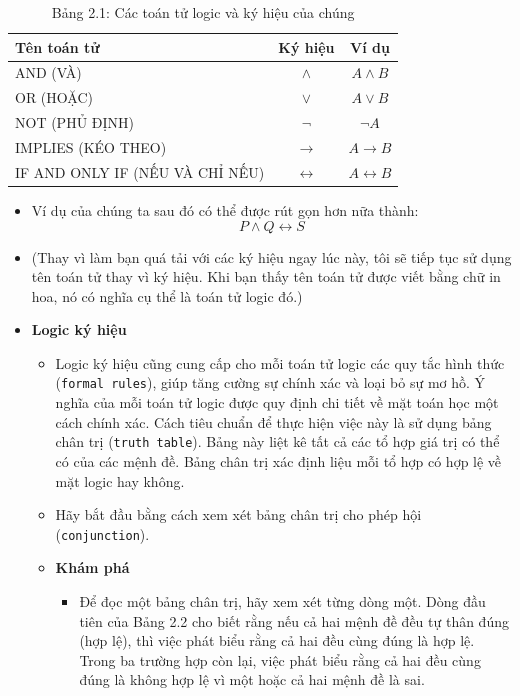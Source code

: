 \begin{table}[H]
\centering
\renewcommand{\arraystretch}{1.4}
\begin{tabular}{|l|c|c|}
\hline
\textbf{Tên toán tử} & \textbf{Ký hiệu} & \textbf{Ví dụ} \\ \hline

AND (VÀ) & $\land$ & $A \land B$ \\ \hline

OR (HOẶC) & $\lor$ & $A \lor B$ \\ \hline

NOT (PHỦ ĐỊNH) & $\neg$ & $\neg A$ \\ \hline

IMPLIES (KÉO THEO) & $\rightarrow$ & $A \rightarrow B$ \\ \hline

IF AND ONLY IF (NẾU VÀ CHỈ NẾU) & $\leftrightarrow$ & $A \leftrightarrow B$ \\ \hline

\end{tabular}
\caption*{Bảng 2.1: Các toán tử logic và ký hiệu của chúng}
\end{table}

\begin{itemize}
    \item Ví dụ của chúng ta sau đó có thể được rút gọn hơn nữa thành:
    \[
        P \land Q \leftrightarrow S
    \]

    \item (Thay vì làm bạn quá tải với các ký hiệu ngay lúc này, tôi sẽ tiếp tục sử dụng tên toán tử thay vì ký hiệu. Khi bạn thấy tên toán tử được viết bằng chữ in hoa, nó có nghĩa cụ thể là toán tử logic đó.)

    \item \textbf{Logic ký hiệu}
    \begin{itemize}
        \item Logic ký hiệu cũng cung cấp cho mỗi toán tử logic các quy tắc hình thức (\texttt{formal rules}), giúp tăng cường sự chính xác và loại bỏ sự mơ hồ. Ý nghĩa của mỗi toán tử logic được quy định chi tiết về mặt toán học một cách chính xác. Cách tiêu chuẩn để thực hiện việc này là sử dụng bảng chân trị (\texttt{truth table}). Bảng này liệt kê tất cả các tổ hợp giá trị có thể có của các mệnh đề. Bảng chân trị xác định liệu mỗi tổ hợp có hợp lệ về mặt logic hay không.

        \item Hãy bắt đầu bằng cách xem xét bảng chân trị cho phép hội (\texttt{conjunction}).

        \item \textbf{Khám phá}
        \begin{itemize}
            \item Để đọc một bảng chân trị, hãy xem xét từng dòng một. Dòng đầu tiên của Bảng 2.2 cho biết rằng nếu cả hai mệnh đề đều tự thân đúng (hợp lệ), thì việc phát biểu rằng cả hai đều cùng đúng là hợp lệ. Trong ba trường hợp còn lại, việc phát biểu rằng cả hai đều cùng đúng là không hợp lệ vì một hoặc cả hai mệnh đề là sai.
        \end{itemize}
    \end{itemize}
\end{itemize}

